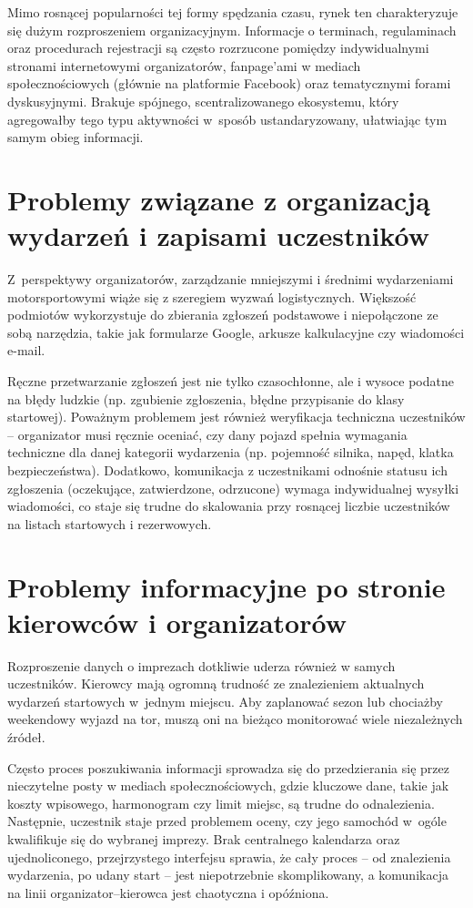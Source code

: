 \documentclass{sprz}
\begin{document}
Mimo rosnącej popularności tej formy spędzania czasu, rynek ten charakteryzuje się dużym rozproszeniem organizacyjnym. Informacje o terminach, regulaminach oraz procedurach rejestracji są często rozrzucone pomiędzy indywidualnymi stronami internetowymi organizatorów, fanpage'ami w mediach społecznościowych (głównie na platformie Facebook) oraz tematycznymi forami dyskusyjnymi. Brakuje spójnego, scentralizowanego ekosystemu, który agregowałby tego typu aktywności w~sposób ustandaryzowany, ułatwiając tym samym obieg informacji.

\section{Problemy związane z organizacją wydarzeń i zapisami uczestników}  
Z~perspektywy organizatorów, zarządzanie mniejszymi i średnimi wydarzeniami motorsportowymi wiąże się z szeregiem wyzwań logistycznych. Większość podmiotów wykorzystuje do zbierania zgłoszeń podstawowe i niepołączone ze sobą narzędzia, takie jak formularze Google, arkusze kalkulacyjne czy wiadomości e-mail. 

Ręczne przetwarzanie zgłoszeń jest nie tylko czasochłonne, ale i wysoce podatne na błędy ludzkie (np. zgubienie zgłoszenia, błędne przypisanie do klasy startowej). Poważnym problemem jest również weryfikacja techniczna uczestników -- organizator musi ręcznie oceniać, czy dany pojazd spełnia wymagania techniczne dla danej kategorii wydarzenia (np. pojemność silnika, napęd, klatka bezpieczeństwa). Dodatkowo, komunikacja z uczestnikami odnośnie statusu ich zgłoszenia (oczekujące, zatwierdzone, odrzucone) wymaga indywidualnej wysyłki wiadomości, co staje się trudne do skalowania przy rosnącej liczbie uczestników na listach startowych i rezerwowych.

\section{Problemy informacyjne po stronie kierowców i organizatorów}  
Rozproszenie danych o imprezach dotkliwie uderza również w samych uczestników. Kierowcy mają ogromną trudność ze znalezieniem aktualnych wydarzeń startowych w~jednym miejscu. Aby zaplanować sezon lub chociażby weekendowy wyjazd na tor, muszą oni na bieżąco monitorować wiele niezależnych źródeł. 

Często proces poszukiwania informacji sprowadza się do przedzierania się przez nieczytelne posty w mediach społecznościowych, gdzie kluczowe dane, takie jak koszty wpisowego, harmonogram czy limit miejsc, są trudne do odnalezienia. Następnie, uczestnik staje przed problemem oceny, czy jego samochód w~ogóle kwalifikuje się do wybranej imprezy. Brak centralnego kalendarza oraz ujednoliconego, przejrzystego interfejsu sprawia, że cały proces -- od znalezienia wydarzenia, po udany start -- jest niepotrzebnie skomplikowany, a komunikacja na linii organizator–kierowca jest chaotyczna i opóźniona.
\end{document}

